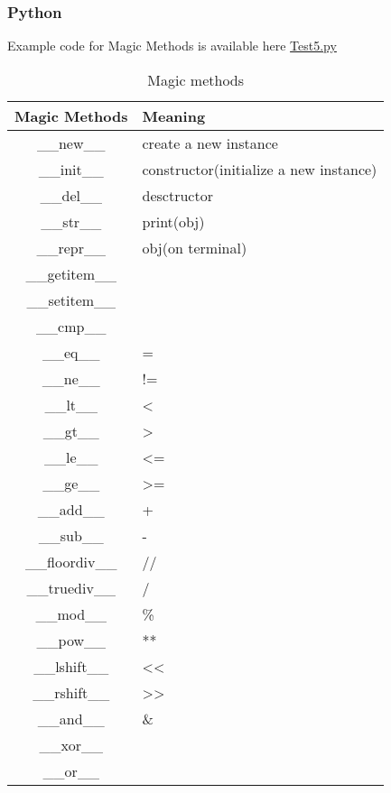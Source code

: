 \documentclass[12pt, a4pape]{article}
\begin{document}
		\subsubsection{Python}
		Example code for Magic Methods is available here \href{https://github.com/muerbingsha/compsumm/blob/master/learn/python/Test5.py}{Test5.py}
		\begin{table}[H]
		\centering
		\begin{tabular}{|c|l|}
		\toprule
		Magic Methods & Meaning \\
		\toprule
		\_\_new\_\_ & create a new instance \\
		\_\_init\_\_ & constructor(initialize a new instance)  \\
		\_\_del\_\_ & desctructor \\
		\hline
		\_\_str\_\_ & print(obj) \\
		\_\_repr\_\_ & obj(on terminal) \\
		\hline
		\_\_getitem\_\_ & \\
		\_\_setitem\_\_ & \\
		\hline
		\_\_cmp\_\_ & \\
		\_\_eq\_\_ & = \\
		\_\_ne\_\_ & != \\
		\_\_lt\_\_ & < \\
		\_\_gt\_\_ & > \\
		\_\_le\_\_ & <= \\
		\_\_ge\_\_ & >= \\
		\hline
		\_\_add\_\_ & + \\
		\_\_sub\_\_ & - \\
		\_\_floordiv\_\_ & // \\
		\_\_truediv\_\_ & / \\
		\_\_mod\_\_ & \% \\
		\_\_pow\_\_ & ** \\
		\_\_lshift\_\_ & << \\
		\_\_rshift\_\_ & >> \\
		\_\_and\_\_  & \& \\
		\_\_xor\_\_ & \\
		\_\_or\_\_ & \\
		\bottomrule
		\end{tabular}
		\caption{Magic methods}
		\end{table}
		
\end{document}
